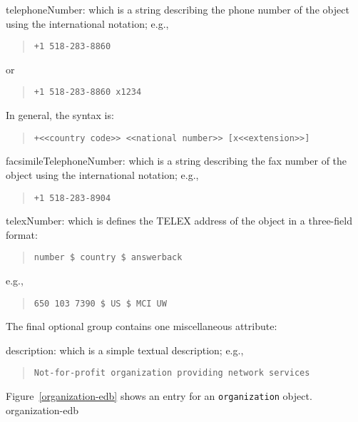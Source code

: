 \begin{describe}
\item[telephoneNumber:]
		which is a string describing the phone number of the object
		using the international notation; e.g.,
\begin{quote}\small\begin{verbatim}
+1 518-283-8860
\end{verbatim}\end{quote}
or
\begin{quote}\small\begin{verbatim}
+1 518-283-8860 x1234
\end{verbatim}\end{quote}
In general, the syntax is:
\begin{quote}\smaller\begin{verbatim}
+<<country code>> <<national number>> [x<<extension>>]
\end{verbatim}\end{quote}

\item[facsimileTelephoneNumber:]
		which is a string describing the fax number of the object
		using the international notation; e.g.,
\begin{quote}\small\begin{verbatim}
+1 518-283-8904
\end{verbatim}\end{quote}

\item[telexNumber:]
		which is defines the TELEX address of the object in a
		three-field format:
\begin{quote}\small\begin{verbatim}
number $ country $ answerback
\end{verbatim}\end{quote}
		e.g.,
\begin{quote}\small\begin{verbatim}
650 103 7390 $ US $ MCI UW
\end{verbatim}\end{quote}
\end{describe}
The final optional group contains one miscellaneous attribute:
\begin{describe}
\item[description:]
			which is a simple textual description;
			e.g.,
\begin{quote}\small\begin{verbatim}
Not-for-profit organization providing network services
\end{verbatim}\end{quote}
\end{describe}
Figure~\ref{organization-edb} shows an entry for an \verb"organization" object.
%
	{organization-edb}

